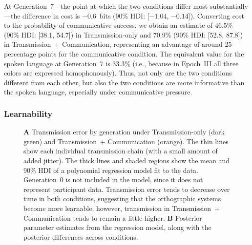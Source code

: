 \documentclass[doc,biblatex]{apa7}
\begin{document}
At Generation~7---the point at which the two conditions differ most substantially---the difference in cost is $-0.6$~bits (90\% HDI: [$-1.04$, $-0.14$]). Converting cost to the probability of communicative success, we obtain an estimate of 46.5\% (90\% HDI: [38.1, 54.7]) in Transmission-only and 70.9\% (90\% HDI: [52.8, 87.8]) in Transmission~+ Communication, representing an advantage of around 25 percentage points for the communicative condition. The equivalent value for the spoken language at Generation~7 is 33.3\% (i.e., because in Epoch~III all three colors are expressed homophonously). Thus, not only are the two conditions different from each other, but also the two conditions are more informative than the spoken language, especially under communicative pressure.

\subsubsection{Learnability}

	\begin{figure}
	\vspace*{2pt}
	\caption{\textbf{A} Transmission error by generation under Transmission-only (dark green) and Transmission~+ Communication (orange). The thin lines show each individual transmission chain (with a small amount of added jitter). The thick lines and shaded regions show the mean and 90\% HDI of a polynomial regression model fit to the data. Generation~0 is not included in the model, since it does not represent participant data. Transmission error tends to decrease over time in both conditions, suggesting that the orthographic systems become more learnable; however, transmission in Transmission~+ Communication tends to remain a little higher. \textbf{B} Posterior parameter estimates from the regression model, along with the posterior differences across conditions.}
	\label{te_con}
	\end{figure}
\end{document}
